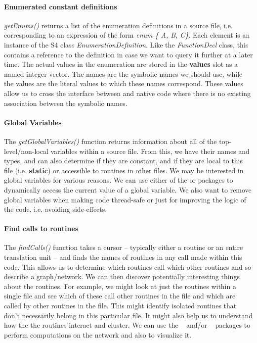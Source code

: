\documentclass[article]{jss}
\def\R{\proglang{R}}
\def\Rpkg#1{\pkg{#1}}
\def\Rfunc#1{\textsl{#1()}}
\def\Rclass#1{\textit{#1}}
\def\Rslot#1{\textbf{#1}}
\def\Ckeyword#1{\textbf{#1}}
\def\Cexpr#1{\textsl{#1}}
\begin{document}
\paragraph{Enumerated constant definitions}
\Rfunc{getEnums} returns a list of the enumeration definitions in a
source file, i.e. corresponding to an expression of the form
\Cexpr{enum \{ A, B, C\}}. Each element is an instance of the S4 class
\Rclass{EnumerationDefinition}.  Like the \Rclass{FunctionDecl} class,
this contains a reference to the definition in case we want to query
it further at a later time.  The actual values in the enumeration are
stored in the \Rslot{values} slot as a named integer vector.  The
names are the symbolic names we should use, while the values are the
literal values to which these names correspond.  These values allow us
to cross the interface between \R{} and native code where there is no
existing association between the symbolic names.

\paragraph{Global Variables}
The \Rfunc{getGlobalVariables} function returns information about all
of the top-level/non-local variables within a source file.  From this, we have
their names and types, and can also determine if they are constant,
and if they are local to this file (i.e. \Ckeyword{static}) or
accessible to routines in other files.  We may be interested in global
variables for various reasons.  We can use either of the
\Rpkg{rdyncall} or \Rpkg{Rffi} packages to dynamically access the
current value of a global variable.  We also want to remove global
variables when making code thread-safe or just for improving the logic
of the code, i.e. avoiding side-effects.


\paragraph{Find calls to routines}
The \Rfunc{findCalls} function takes a cursor -- typically either a
routine or an entire translation unit -- and finds the names of
routines in any call made within this code.  This allows us to
determine which routines call which other routines and so describe a
graph/network.  We can then discover potentially interesting things
about the routines.  For example, we might look at just the routines
within a single file and see which of these call other routines in the
file and which are called by other routines in the file.  This might
identify isolated routines that don't necessarily belong in this
particular file. It might also help us to understand how the the
routines interact and cluster.  We can use the \Rpkg{igraph}~\cite{bib:igraph} and/or
\Rpkg{graph}~\cite{bib:graph} packages to perform computations on the network and also
to visualize it.
\end{document}

